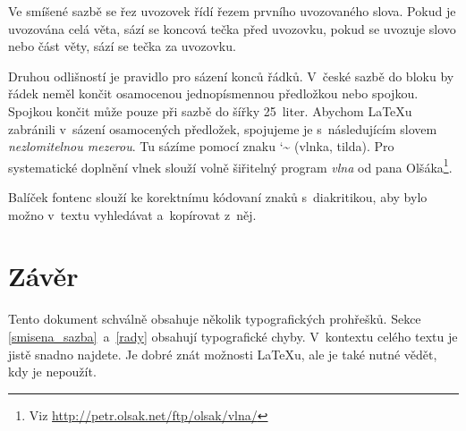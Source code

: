 \documentclass[10pt, a4paper, twocolumn]{article}
\begin{document}
Ve smíšené sazbě se řez uvozovek řídí řezem prvního
uvozovaného slova. Pokud je uvozována celá věta, sází se
koncová tečka před uvozovku, pokud se uvozuje slovo nebo
část věty, sází se tečka za uvozovku.

Druhou odlišností je pravidlo pro sázení konců řádků.
V~české sazbě do bloku by řádek neměl končit osamocenou jednopísmennou předložkou nebo spojkou. Spojkou  končit může pouze při sazbě do šířky 25~liter. Abychom \LaTeX u zabránili v~sázení osamocených předložek, spojujeme je s~následujícím slovem \emph{nezlomitelnou mezerou}. Tu sázíme pomocí znaku {\selectfont \char`\~} (vlnka, tilda). Pro systematické doplnění vlnek slouží volně šiřitelný program \emph{vlna} od pana Olšáka\footnote{Viz \selectfont \url{ http://petr.olsak.net/ftp/olsak/vlna/}}.

Balíček {\selectfont fontenc} slouží ke korektnímu kódovaní znaků
s~diakritikou, aby bylo možno v~textu vyhledávat a~kopírovat z~něj.


\section{Závěr}

Tento dokument schválně obsahuje několik typografických
prohřešků. Sekce \ref{smisena_sazba}~a~\ref{rady} obsahují typografické chyby. V~kontextu celého textu je jistě snadno najdete. Je dobré znát
možnosti \LaTeX u, ale je také nutné vědět, kdy je nepoužít.
\end{document}
